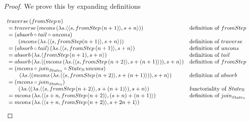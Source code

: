 \begin{proof}
We prove this by expanding definitions

$$
\begin{array}{ll}
\mathsf{traverse}\, (\fromstepstr\, n) \\
{}= \mathsf{traverse}\, (\mcons\, (\lambda s. \pair{\pair{s}{\fromstepstr\, (n + 1)}}{s + n}))
	& \mbox{definition of }\fromstepstr \\
{}= (\mathsf{absorb} \comp \tail \comp \uncons)\, \\\qquad (\mcons\, (\lambda s. \pair{\pair{s}{\fromstepstr (n + 1)}}{s + n}))
	& \mbox{definition of }\mathsf{traverse} \\
{}= (\mathsf{absorb} \comp \tail)\, (\lambda s. \pair{\pair{s}{\fromstepstr\, (n + 1)}}{s + n})
	& \mbox{definition of }\uncons \\
{}= \mathsf{absorb}\, (\lambda s. \pair{\fromstepstr\, (n + 1)}{s + n})
	& \mbox{definition of }\tail \\
{}= \mathsf{absorb}\, (\lambda s. \pair{(\mcons\, (\lambda s. \pair{\pair{s}{\fromstepstr\, (n + 2)}}{s + (n + 1)}))}{s + n})
	& \mbox{definition of }\fromstepstr \\
{}= (\mcons \comp \join_{\state_{\nat}} \comp \state_{\nat}\,\uncons) \\\qquad \, (\lambda s. \pair{(\mcons\, (\lambda s. \pair{\pair{s}{\fromstepstr\, (n + 2)}}{s + (n + 1)}))}{s + n})
	& \mbox{definition of }\mathsf{absorb} \\
{}= (\mcons \comp \join_{\state_{\nat}})\, \\\qquad (\lambda s. \pair{(\lambda s. \pair{\pair{s}{\fromstepstr\, (n + 2)}}{s + (n + 1)})}{s + n})
	& \mbox{functoriality of }\state_{\nat} \\
{}= \mcons\, (\lambda s. \pair{\pair{s + n}{\fromstepstr\,(n + 2)}}{(s + n) + (n + 1)})
	& \mbox{definition of } \join_{\state_{\nat}} \\
{}= \mcons\, (\lambda s. \pair{\pair{s + n}{\fromstepstr\,(n + 2)}}{s + 2n + 1})
\end{array}
$$
\end{proof}

